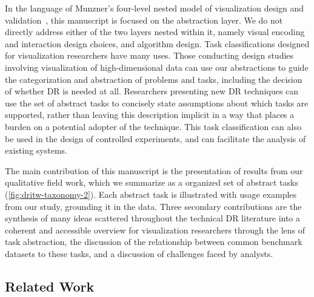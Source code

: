 In the language of Munzner's four-level nested model of visualization design and validation~\cite{Meyer2015,Munzner2009}, this manuscript is focused on the abstraction layer. 
We do not directly address either of the two layers nested within it, namely visual encoding and interaction design choices, and algorithm design. 
Task classifications designed for visualization researchers have many uses.
Those conducting design studies involving visualization of high-dimensional data can use our abstractions to guide the categorization and abstraction of problems and tasks, including the decision of whether \ac{DR} is needed at all. 
Researchers presenting new \ac{DR} techniques can use the set of abstract tasks to concisely state assumptions about which tasks are supported, rather than leaving this description implicit in a way that places a burden on a potential adopter of the technique. 
This task classification can also be used in the design of controlled experiments, and can facilitate the analysis of existing systems. 

The main contribution of this manuscript is the presentation of results from our qualitative field work, which we summarize as a organized set of abstract tasks (\autoref{fig:dritw-taxonomy-2}). 
Each abstract task is illustrated with usage examples from our study, grounding it in the data.  
Three secondary contributions are the synthesis of many ideas scattered throughout the technical \ac{DR} literature into a coherent and accessible overview for visualization researchers through the lens of task abstraction, the discussion of the relationship between common benchmark datasets to these tasks, and a discussion of challenges faced by analysts.  


\subsection{Related Work}
\label{app:drvistasks:dritw:rw}


